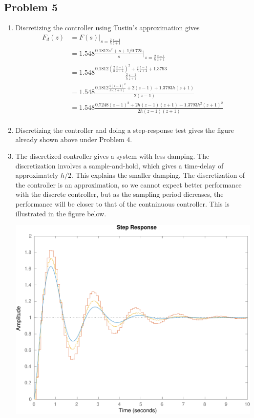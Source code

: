 \documentclass{scrartcl}
\begin{document}
\subsection*{Problem 5}
\label{sec:orgheadline15}
\begin{enumerate}
\item Discretizing the controller using Tustin's approximation gives
\begin{equation*}
\begin{split}
 F_d(z) &= F(s)|_{s=\frac{2}{h}\frac{z-1}{z+1}}\\
       &= 1.548 \frac{0.1812s^2 + s +1/0.725}{s}|_{s=\frac{2}{h}\frac{z-1}{z+1}}\\
       &= 1.548 \frac{0.1812 \left( \frac{2}{h}\frac{z-1}{z+1} \right)^2 + \frac{2}{h}\frac{z-1}{z+1} + 1.3793}{\frac{2}{h}\frac{z-1}{z+1}}\\  
       &= 1.548 \frac{0.1812 \frac{4(z-1)^2}{h(z+1)} + 2(z-1) + 1.3793 h(z+1)}{2(z-1)}\\
       &= 1.548 \frac{0.7248 (z-1)^2 + 2h(z-1)(z+1) + 1.3793 h^2(z+1)^2}{2h(z-1)(z+1)}\\
       \end{split}
\end{equation*}
\item Discretizing the controller and doing a step-response test gives the figure already shown above under Problem 4.
\item The discretized controller gives a system with less damping. The discretization involves a sample-and-hold, which gives a time-delay of approximately \(h/2\). This explains the smaller damping. The discretization of the controller is an approximation, so we cannot expect better performance with the discrete controller, but as the sampling period dicreases, the performance will be closer to that of the contninuous controller. This is illustrated in the figure below. 
\begin{center}
\includegraphics[width=0.6\linewidth]{tuned_response_half_h_hw3_spring16}
\end{center}
\end{enumerate}
\end{document}
